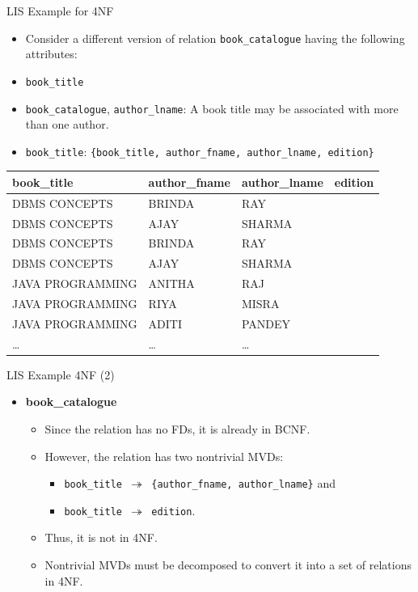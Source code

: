 \documentclass[aspectratio=169, xcolor=dvipsnames]{beamer}
\begin{document}
\begin{frame}{LIS Example for 4NF}
    \begin{itemize}
        \item Consider a different version of relation \texttt{book\_catalogue} having the following attributes:
        \item \texttt{book\_title}
        \item \texttt{book\_catalogue}, \texttt{author\_lname}: A book title may be associated with more than one author.
        \item \texttt{book\_title}: \texttt{\{book\_title, author\_fname, author\_lname, edition\}}
    \end{itemize}
    \begin{table}
    \centering
    \begin{tabular}{llll}
    \toprule
    \textbf{book\_title} & \textbf{author\_fname} & \textbf{author\_lname} & \textbf{edition} \\
    \midrule
    DBMS CONCEPTS & BRINDA & RAY & \\
    DBMS CONCEPTS & AJAY & SHARMA & \\
    DBMS CONCEPTS & BRINDA & RAY & \\
    DBMS CONCEPTS & AJAY & SHARMA & \\
    JAVA PROGRAMMING & ANITHA & RAJ & \\
    JAVA PROGRAMMING & RIYA & MISRA & \\
    JAVA PROGRAMMING & ADITI & PANDEY & \\
    \dots & \dots & \dots & \\
    \bottomrule
    \end{tabular}
    \end{table}
\end{frame}

\begin{frame}{LIS Example 4NF (2)}
    \begin{itemize}
        \item \textbf{book\_catalogue}
        \begin{itemize}
            \item Since the relation has no FDs, it is already in BCNF.
            \item However, the relation has two nontrivial MVDs:
            \begin{itemize}
                \item \texttt{book\_title $\twoheadrightarrow$ \{author\_fname, author\_lname\}} and
                \item \texttt{book\_title $\twoheadrightarrow$ edition}.
            \end{itemize}
            \item Thus, it is not in 4NF.
            \item Nontrivial MVDs must be decomposed to convert it into a set of relations in 4NF.
        \end{itemize}
    \end{itemize}
\end{frame}
\end{document}
